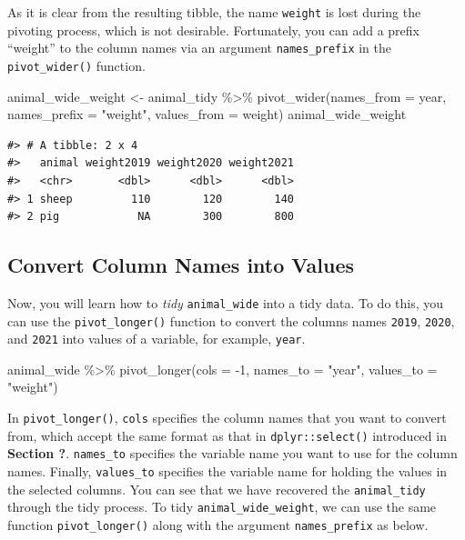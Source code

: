 \documentclass[
]{book}
\newenvironment{Shaded}{\begin{snugshade}}{\end{snugshade}}
\newcommand{\AttributeTok}[1]{\textcolor[rgb]{0.77,0.63,0.00}{#1}}
\newcommand{\DecValTok}[1]{\textcolor[rgb]{0.00,0.00,0.81}{#1}}
\newcommand{\FunctionTok}[1]{\textcolor[rgb]{0.00,0.00,0.00}{#1}}
\newcommand{\NormalTok}[1]{#1}
\newcommand{\OtherTok}[1]{\textcolor[rgb]{0.56,0.35,0.01}{#1}}
\newcommand{\SpecialCharTok}[1]{\textcolor[rgb]{0.00,0.00,0.00}{#1}}
\newcommand{\StringTok}[1]{\textcolor[rgb]{0.31,0.60,0.02}{#1}}
\begin{document}
As it is clear from the resulting tibble, the name \texttt{weight} is lost during the pivoting process, which is not desirable. Fortunately, you can add a prefix ``weight'' to the column names via an argument \texttt{names\_prefix} in the \texttt{pivot\_wider()} function.

\begin{Shaded}
\begin{Highlighting}[]
\NormalTok{animal\_wide\_weight }\OtherTok{\textless{}{-}}\NormalTok{ animal\_tidy }\SpecialCharTok{\%\textgreater{}\%} \FunctionTok{pivot\_wider}\NormalTok{(}\AttributeTok{names\_from =}\NormalTok{ year,}
            \AttributeTok{names\_prefix =} \StringTok{"weight"}\NormalTok{,}
            \AttributeTok{values\_from =}\NormalTok{ weight) }
\NormalTok{animal\_wide\_weight   }
\end{Highlighting}
\end{Shaded}

\begin{verbatim}
#> # A tibble: 2 x 4
#>   animal weight2019 weight2020 weight2021
#>   <chr>       <dbl>      <dbl>      <dbl>
#> 1 sheep         110        120        140
#> 2 pig            NA        300        800
\end{verbatim}

\hypertarget{tidy-long}{%
\subsection{Convert Column Names into Values}\label{tidy-long}}

Now, you will learn how to \emph{tidy} \texttt{animal\_wide} into a tidy data. To do this, you can use the \texttt{pivot\_longer()} function to convert the columns names \texttt{2019}, \texttt{2020}, and \texttt{2021} into values of a variable, for example, \texttt{year}.

\begin{Shaded}
\begin{Highlighting}[]
\NormalTok{animal\_wide }\SpecialCharTok{\%\textgreater{}\%} 
  \FunctionTok{pivot\_longer}\NormalTok{(}\AttributeTok{cols =} \SpecialCharTok{{-}}\DecValTok{1}\NormalTok{, }
               \AttributeTok{names\_to =} \StringTok{"year"}\NormalTok{, }
               \AttributeTok{values\_to =} \StringTok{"weight"}\NormalTok{)}
\end{Highlighting}
\end{Shaded}

In \texttt{pivot\_longer()}, \texttt{cols} specifies the column names that you want to convert from, which accept the same format as that in \texttt{dplyr::select()} introduced in \textbf{Section ?}. \texttt{names\_to} specifies the variable name you want to use for the column names. Finally, \texttt{values\_to} specifies the variable name for holding the values in the selected columns.
You can see that we have recovered the \texttt{animal\_tidy} through the tidy process. To tidy \texttt{animal\_wide\_weight}, we can use the same function \texttt{pivot\_longer()} along with the argument \texttt{names\_prefix} as below.
\end{document}
